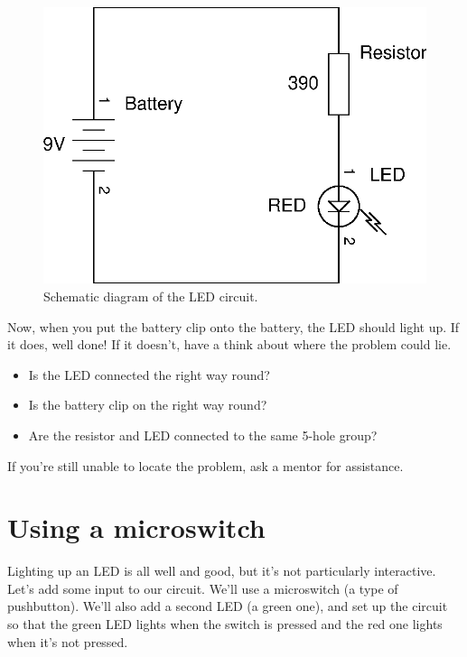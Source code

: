 \documentclass{article}
\begin{document}
\begin{figure}
\centering
\includegraphics[width=\textwidth]{assets/fig/schem/led}
\caption{Schematic diagram of the LED circuit.}
\label{fig:schem:led}
\end{figure}

Now, when you put the battery clip onto the battery, the LED should light up.
If it does, well done! If it doesn't, have a think about where the problem
could lie.

\begin{itemize}
\item Is the LED connected the right way round?
\item Is the battery clip on the right way round? 
\item Are the resistor and LED connected to the same 5-hole group?
\end{itemize}

If you're still unable to locate the problem, ask a mentor for assistance.

\section{Using a microswitch}

Lighting up an LED is all well and good, but it's not particularly interactive.
Let's add some input to our circuit. We'll use a microswitch (a type of
pushbutton). We'll also add a second LED (a green one), and set up the circuit
so that the green LED lights when the switch is pressed and the red one lights
when it's not pressed.
\end{document}
